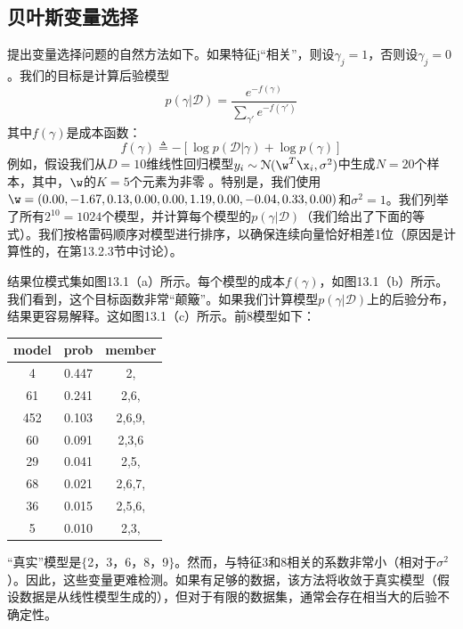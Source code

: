 \documentclass[a4paper]{article}
\begin{document}
\subsection{贝叶斯变量选择}
提出变量选择问题的自然方法如下。如果特征j“相关”，则设$\gamma_j=1$，否则设$\gamma_j=0$。我们的目标是计算后验模型 
\begin{equation}
	p(\gamma|\mathcal{D})=\dfrac{e^{-f(\gamma)}}{\sum\nolimits_{\gamma'}e^{-f(\gamma')}}\tag{13.1}
\end{equation}
其中$f(\gamma)$是成本函数： 
\begin{equation}
	f(\gamma)\triangleq -[\log p(\mathcal{D}|\gamma)+\log p(\gamma)]\tag{13.2}
\end{equation}
例如，假设我们从$D=10$维线性回归模型$y_i\sim \mathcal{N}(\w^T\x_i,\sigma^2)$中生成$N=20$个样本，其中，$\w$的$K=5$个元素为非零 。特别是，我们使用$\w=(0.00,-1.67, 0.13, 0.00, 0.00, 1.19, 0.00, -0.04,0.33,0.00)$和$\sigma^2=1$。我们列举了所有$2^{10}=1024$个模型，并计算每个模型的$p(\gamma|\mathcal{D})$（我们给出了下面的等式）。我们按格雷码顺序对模型进行排序，以确保连续向量恰好相差1位（原因是计算性的，在第13.2.3节中讨论）。 

结果位模式集如图13.1（a）所示。每个模型的成本$f(\gamma)$，如图13.1（b）所示。我们看到，这个目标函数非常“颠簸”。如果我们计算模型$p(\gamma|\mathcal{D})$上的后验分布，结果更容易解释。这如图13.1（c）所示。前8模型如下： 

\begin{center}
	\begin{tabular}{ccc}
	
	model & prob & member \\
	\midrule
	4 & 0.447 & 2,  \\
	61 & 0.241 & 2,6,  \\
	452 & 0.103 & 2,6,9,  \\
	60 & 0.091 & 2,3,6  \\
	29 & 0.041 & 2,5,  \\
	68 & 0.021 & 2,6,7,  \\
	36 & 0.015 & 2,5,6,  \\
	5 & 0.010 & 2,3,  \\
\end{tabular}
\end{center}

“真实”模型是$\{$2，3，6，8，9$\}$。然而，与特征3和8相关的系数非常小（相对于$\sigma^2$）。因此，这些变量更难检测。如果有足够的数据，该方法将收敛于真实模型（假设数据是从线性模型生成的），但对于有限的数据集，通常会存在相当大的后验不确定性。 
\end{document}
